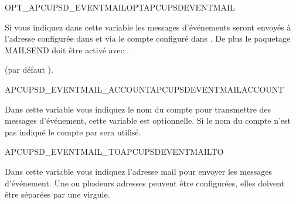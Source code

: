 \begin {description}

 {OPT\_APCUPSD\_EVENTMAIL}{OPTAPCUPSDEVENTMAIL}

   Si vous indiquez  dans cette variable les messages d'événements seront envoyés
   à l'adresse configurée dans 
   et via le compte configuré dans .
   De plus le paquetage MAILSEND doit être activé avec .

  (par défaut ). 


 {APCUPSD\_EVENTMAIL\_ACCOUNT}{APCUPSDEVENTMAILACCOUNT}

  Dans cette variable vous indiquez le nom du compte pour transmettre des messages d'événement,
  cette variable est optionnelle. Si le nom du compte n'est pas indiqué le compte par 
  sera utilisé.


 {APCUPSD\_EVENTMAIL\_TO}{APCUPSDEVENTMAILTO}

  Dans cette variable vous indiquez l'adresse mail pour envoyer les messages d'événement.
  Une ou plusieurs adresses peuvent être configurées, elles doivent être séparées par une
  virgule.

\end {description}

